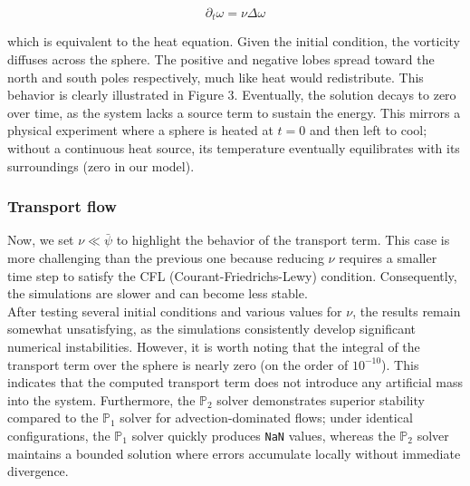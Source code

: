 \documentclass{article}
\theoremstyle{definition}
\theoremstyle{proposition}
\theoremstyle{theorem}
\theoremstyle{remark}
\theoremstyle{corollary}  %
\theoremstyle{exercise}
\theoremstyle{lemma}
\begin{document}
$$\partial_t \omega = \nu \Delta \omega$$

which is equivalent to the heat equation. Given the initial condition, the vorticity diffuses across the sphere. The positive and negative lobes spread toward the north and south poles respectively, much like heat would redistribute. This behavior is clearly illustrated in Figure 3. Eventually, the solution decays to zero over time, as the system lacks a source term to sustain the energy. This mirrors a physical experiment where a sphere is heated at $t=0$ and then left to cool; without a continuous heat source, its temperature eventually equilibrates with its surroundings (zero in our model).

\subsubsection{Transport flow}

Now, we set $\nu \ll \bar{\psi}$ to highlight the behavior of the transport term. This case is more challenging than the previous one because reducing $\nu$ requires a smaller time step to satisfy the CFL (Courant-Friedrichs-Lewy) condition. Consequently, the simulations are slower and can become less stable.\\

After testing several initial conditions and various values for $\nu$, the results remain somewhat unsatisfying, as the simulations consistently develop significant numerical instabilities. However, it is worth noting that the integral of the transport term over the sphere is nearly zero (on the order of $10^{-10}$). This indicates that the computed transport term does not introduce any artificial mass into the system. Furthermore, the $\mathbb{P}_2$ solver demonstrates superior stability compared to the $\mathbb{P}_1$ solver for advection-dominated flows; under identical configurations, the $\mathbb{P}_1$ solver quickly produces \texttt{NaN} values, whereas the $\mathbb{P}_2$ solver maintains a bounded solution where errors accumulate locally without immediate divergence.
\end{document}
